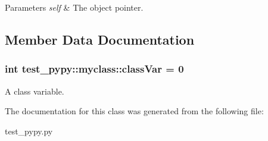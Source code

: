 \begin{DoxyParams}{\-Parameters}
{\em self} & \-The object pointer. \\
\hline
\end{DoxyParams}


\subsection{\-Member \-Data \-Documentation}
\hypertarget{classtest__pypy_1_1myclass_aa4662a57d837c34d0c946e04ad477c71}{
\subsubsection[{class\-Var}]{\setlength{\rightskip}{0pt plus 5cm}int {\bf test\-\_\-pypy\-::myclass\-::class\-Var} = 0}}\label{classtest__pypy_1_1myclass_aa4662a57d837c34d0c946e04ad477c71}


\-A class variable. 



\-The documentation for this class was generated from the following file\-:\begin{DoxyCompactItemize}
\item 
test\-\_\-pypy.\-py\end{DoxyCompactItemize}
